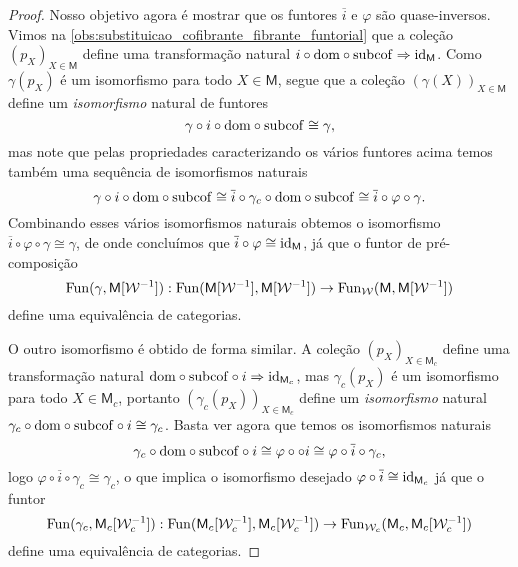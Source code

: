 \begin{proof}
  Nosso objetivo agora é mostrar que os funtores $\overline{i}$ e $\varphi$ são quase-inversos.
  Vimos na \cref{obs:substituicao_cofibrante_fibrante_funtorial} que a coleção $(p_{X})_{X \in \mathsf{M}}$ define uma transformação natural $i \circ \mathrm{dom} \circ \mathrm{subcof} \Rightarrow \mathrm{id}_{\mathsf{M}}$.
  Como $\gamma(p_{X})$ é um isomorfismo para todo $X \in \mathsf{M}$, segue que a coleção $(\gamma(X))_{X \in \mathsf{M}}$ define um \emph{isomorfismo} natural de funtores
  \begin{displaymath}
    \gamma \circ i \circ \mathrm{dom} \circ \mathrm{subcof} \cong \gamma,
  \end{displaymath}
  mas note que pelas propriedades caracterizando os vários funtores acima temos também uma sequência de isomorfismos naturais
  \begin{displaymath}
    \gamma \circ i \circ \mathrm{dom} \circ \mathrm{subcof} \cong \overline{i} \circ \gamma_{c} \circ \mathrm{dom} \circ \mathrm{subcof} \cong \overline{i} \circ \varphi \circ \gamma.
  \end{displaymath}
  Combinando esses vários isomorfismos naturais obtemos o isomorfismo $\overline{i} \circ \varphi \circ \gamma \cong \gamma$, de onde concluímos que $\overline{i} \circ \varphi \cong \mathrm{id}_{\mathsf{M}}$, já que o funtor de pré-composição
  \begin{displaymath}
    \mathrm{Fun}(\gamma,\mathsf{M}[\mathcal{W}^{-1}]): \mathrm{Fun}(\mathsf{M}[\mathcal{W}^{-1}],\mathsf{M}[\mathcal{W}^{-1}]) \to \mathrm{Fun}_{\mathcal{W}}(\mathsf{M},\mathsf{M}[\mathcal{W}^{-1}])
  \end{displaymath}
  define uma equivalência de categorias.

  O outro isomorfismo é obtido de forma similar.
  A coleção $(p_{X})_{X \in \mathsf{M}_{c}}$ define uma transformação natural $\mathrm{dom} \circ \mathrm{subcof} \circ i \Rightarrow \mathrm{id}_{\mathsf{M}_{c}}$, mas $\gamma_{c}(p_{X})$ é um isomorfismo para todo $X \in \mathsf{M}_{c}$, portanto $(\gamma_{c}(p_{X}))_{X \in \mathsf{M}_{c}}$ define um \emph{isomorfismo} natural $\gamma_{c} \circ \mathrm{dom} \circ \mathrm{subcof} \circ i \cong \gamma_{c}$.
  Basta ver agora que temos os isomorfismos naturais
  \begin{displaymath}
    \gamma_{c} \circ \mathrm{dom} \circ \mathrm{subcof} \circ i \cong \varphi \circ \circ i \cong \varphi \circ \overline{i} \circ \gamma_{c},
  \end{displaymath}
  logo $\varphi \circ \overline{i} \circ \gamma_{c} \cong \gamma_{c}$, o que implica o isomorfismo desejado $\varphi \circ \overline{i} \cong \mathrm{id}_{\mathsf{M}_{c}}$ já que o funtor
  \begin{displaymath}
    \mathrm{Fun}(\gamma_{c},\mathsf{M}_{c}[\mathcal{W}_{c}^{-1}]): \mathrm{Fun}(\mathsf{M}_{c}[\mathcal{W}_{c}^{-1}],\mathsf{M}_{c}[\mathcal{W}_{c}^{-1}]) \to \mathrm{Fun}_{\mathcal{W}_{c}}(\mathsf{M}_{c}, \mathsf{M}_{c}[\mathcal{W}_{c}^{-1}])
  \end{displaymath}
  define uma equivalência de categorias.


\end{proof}
